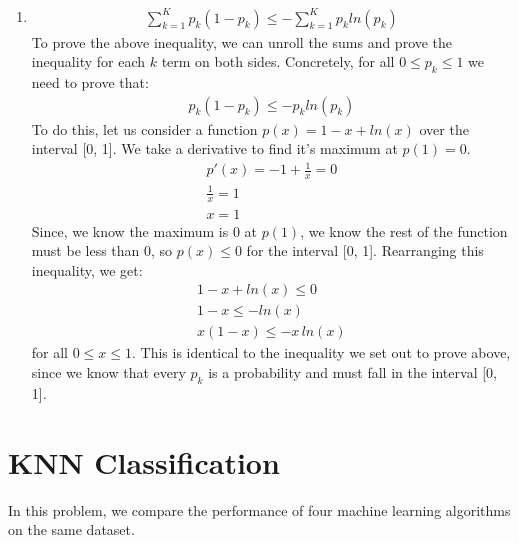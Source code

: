 \documentclass[12pt]{article}
\begin{document}
\begin{enumerate}[label=\alph*.]
     \item
	\begin{gather*}
		\sum_{k = 1}^{K}{p_k(1 - p_k)} \leq - \sum_{k = 1}^{K}{p_k ln(p_k)}
	\end{gather*}
	To prove the above inequality, we can unroll the sums and prove the inequality for each $k$ term on both sides. Concretely, for all $0 \leq p_k \leq 1$ we need to prove that:
	\begin{gather*}
		p_k(1 - p_k) \leq - p_k ln(p_k)    
	\end{gather*}
	To do this, let us consider a function $p(x) = 1 - x + ln(x)$ over the interval [0, 1]. We take a derivative to find it's maximum at $p(1) = 0$.
	\begin{gather*}
		p'(x) = -1 + \frac{1}{x} = 0 \\
		\frac{1}{x} = 1 \\
		x = 1
	\end{gather*}
	Since, we know the maximum is 0 at $p(1)$, we know the rest of the function must be less than 0, so $p(x) \leq 0$ for the interval [0, 1]. Rearranging this inequality, we get:
	\begin{gather*}
		1 - x + ln(x) \leq 0 \\
		1 - x \leq -ln(x) \\
		x(1 - x) \leq -x \, ln(x) 
	\end{gather*}
	for all $0 \leq x \leq 1$. This is identical to the inequality we set out to prove above, since we know that every $p_k$ is a probability and must fall in the interval [0, 1].
\end{enumerate}

\section{KNN Classification}
In this problem, we compare the performance of four machine learning algorithms on the same dataset.
\end{document}
